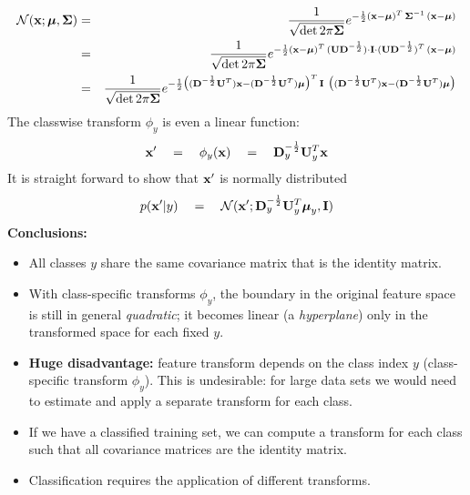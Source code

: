   \begin{eqnarray*}
    \mathcal {N} (\bm{\mathrm{x}} ;\bm{\mathrm{\mu}}, \mathbf{\Sigma}) 
      &=& \frac{1}{\sqrt{\det 2\pi  \mathbf{\Sigma}}} 
          e^{-\frac{1}{2}(\bm{\mathrm{x}} -\bm{\mathrm{\mu}})^T \, \mathbf{\Sigma}^{-1} \, (\bm{\mathrm{x}} - \bm{\mathrm{\mu}})} \\
      &=& \frac{1}{\sqrt{\det 2\pi  \mathbf{\Sigma}}} 
          e^{-\frac{1}{2}(\bm{\mathrm{x}} -\bm{\mathrm{\mu}})^T \, (\mathbf{U}\mathbf{D}^{-\frac{1}{2}})\cdot \mathbf{I} \cdot(\mathbf{U}\mathbf{D}^{-\frac{1}{2}})^T \, (\bm{\mathrm{x}} - \bm{\mathrm{\mu}})} \\
      &=& \frac{1}{\sqrt{\det 2\pi  \mathbf{\Sigma}}} 
          e^{-\frac{1}{2} \big( (\mathbf{D}^{-\frac{1}{2}}\mathbf{U}^T)\bm{\mathrm{x}} - (\mathbf{D}^{-\frac{1}{2}}\mathbf{U}^T)\bm{\mathrm{\mu}} \big)^T \,\mathbf{I} ~
          \big( (\mathbf{D}^{-\frac{1}{2}}\mathbf{U}^T)\bm{\mathrm{x}}- (\mathbf{D}^{-\frac{1}{2}}\mathbf{U}^T)\bm{\mathrm{\mu}} \big) }
  \end{eqnarray*}
  The classwise transform $\phi_y$ is even a linear function:
%
  \begin{displaymath}
    \bm{\mathrm{x}}' \quad = \quad \phi_y(\bm{\mathrm{x}}) \quad = \quad \mathbf{D}_y^{-\frac{1}{2}}\mathbf{U}^T_y\bm{\mathrm{x}}
  \end{displaymath}
  It is straight forward  to show that $\bm{\mathrm{x}}'$ is normally distributed
  \begin{displaymath}
     p(\bm{\mathrm{x}}' | y) \quad = \quad \mathcal {N} (\bm{\mathrm{x}}' ; \mathbf{D}_y^{-\frac{1}{2}}\mathbf{U}^T_y\bm{\mathrm{\mu}}_y, \mathbf{I}) 
  \end{displaymath}
   \textbf{Conclusions:}
  
  \begin{itemize}
    \item All classes $y$ share the same covariance matrix that is the identity matrix.
    \item With class-specific transforms $\phi_y$, the boundary in the original feature space is still in general \emph{quadratic}; it becomes linear (a \emph{hyperplane}) only in the transformed space for each fixed $y$.
    \item \textbf{Huge disadvantage:} feature transform depends on the class index $y$ (class-specific transform $\phi_y$). This is undesirable: for large data sets we would need to estimate and apply a separate transform for each class.
    \item If we have a classified training set, we can compute a transform for each class such that all covariance matrices are the identity matrix.
    \item Classification requires the application of different transforms.
  \end{itemize}
  
